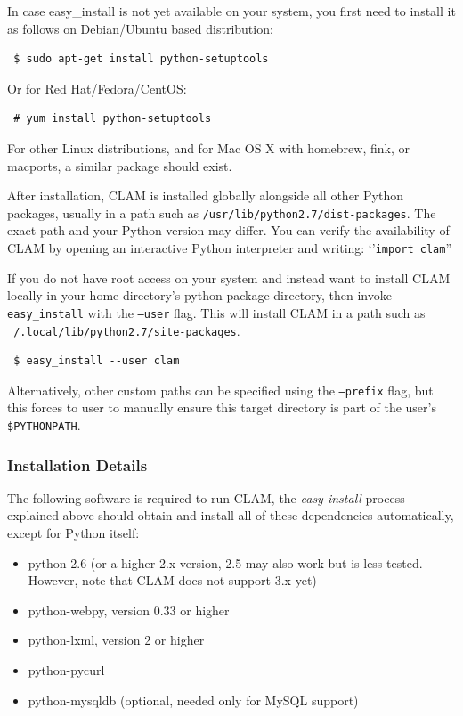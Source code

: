 \documentclass[a4paper,12pt]{report}
\begin{document}
In case easy\_install is not yet available on your system, you first need to
install it as follows on Debian/Ubuntu based distribution: 

\begin{verbatim} $ sudo apt-get install python-setuptools \end{verbatim}

Or for Red Hat/Fedora/CentOS:

\begin{verbatim} # yum install python-setuptools \end{verbatim}

For other Linux distributions, and for Mac OS X with homebrew, fink, or
macports, a similar package should exist. 

After installation, CLAM is installed globally alongside all other Python
packages, usually in a path such as \texttt{/usr/lib/python2.7/dist-packages}.
The exact path and your Python version may differ. You can verify the
availability of CLAM by opening an interactive Python interpreter and writing:
`'\texttt{import clam}''

If you do not have root access on your system and instead want to install CLAM
locally in your home directory's python package directory, then invoke
\texttt{easy\_install} with the \texttt{--user} flag. This will install CLAM in
a path such as \texttt{~/.local/lib/python2.7/site-packages}.

\begin{verbatim} $ easy_install --user clam \end{verbatim}

Alternatively, other custom paths can be specified using the \texttt{--prefix}
flag, but this forces to user to manually ensure this target directory is part
of the user's \texttt{\$PYTHONPATH}.

\subsubsection{Installation Details} 
 
The following software is required to run CLAM, the \emph{easy install} process
explained above should obtain and install all of these dependencies
automatically, except for Python itself:

\begin{itemize}
\item python 2.6 (or a higher 2.x version, 2.5 may also work but is less tested. However, note that CLAM does not support 3.x yet)
\item python-webpy, version 0.33 or higher
\item python-lxml, version 2 or higher
\item python-pycurl
\item python-mysqldb (optional, needed only for MySQL support)
\end{itemize}
\end{document}
